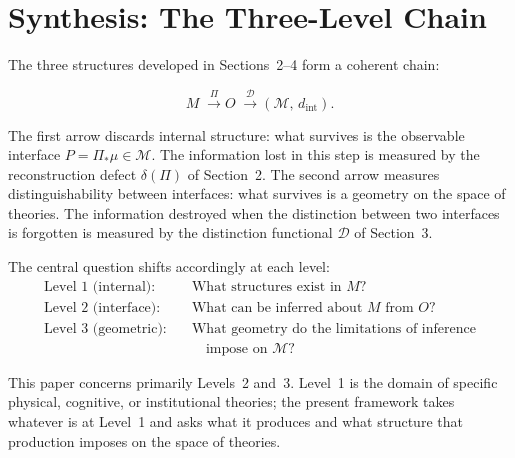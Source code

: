 \documentclass[12pt,a4paper]{article}
\theoremstyle{remark}
\theoremstyle{definition}
\begin{document}
\section{Synthesis: The Three-Level Chain}

The three structures developed in Sections~2--4 form a coherent chain:

\begin{equation}
  M
  \;\xrightarrow{\;\Pi\;}
  O
  \;\xrightarrow{\;\mathcal{D}\;}
  (\mathcal{M},\, d_{\mathrm{int}}).
  \label{eq:chain}
\end{equation}

The first arrow discards internal structure: what survives is the observable
interface $P = \Pi_*\mu \in \mathcal{M}$. The information lost in this step
is measured by the reconstruction defect $\delta(\Pi)$ of Section~2. The
second arrow measures distinguishability between interfaces: what survives
is a geometry on the space of theories. The information destroyed when the
distinction between two interfaces is forgotten is measured by the
distinction functional $\mathcal{D}$ of Section~3.

The central question shifts accordingly at each level:
\begin{align*}
  \text{Level 1 (internal):}\quad
  &\text{What structures exist in } M? \\
  \text{Level 2 (interface):}\quad
  &\text{What can be inferred about } M \text{ from } O? \\
  \text{Level 3 (geometric):}\quad
  &\text{What geometry do the limitations of inference} \\
  &\quad\text{impose on }\mathcal{M}?
\end{align*}

This paper concerns primarily Levels~2 and~3. Level~1 is the domain of
specific physical, cognitive, or institutional theories; the present
framework takes whatever is at Level~1 and asks what it produces and what
structure that production imposes on the space of theories.
\end{document}
